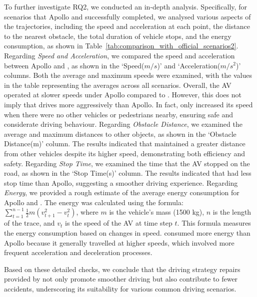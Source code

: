 To further investigate RQ2, we conducted an in-depth analysis. Specifically, for scenarios that Apollo and \coolname successfully completed, we analysed various aspects of the trajectories, including the speed and acceleration at each point, the distance to the nearest obstacle, the total duration of vehicle stops, and the energy consumption, as shown in Table~\ref{tab:comparison_with_official_scenarios2}.
Regarding \emph{Speed and Acceleration}, we compared the speed and acceleration between Apollo and \coolname, as shown in the `Speed($m/s$)' and `Acceleration($m/s^2$)' columns. Both the average and maximum speeds were examined, with the values in the table representing the averages across all scenarios. Overall, the AV operated at slower speeds under Apollo compared to \coolname. However, this does not imply that \coolname drives more aggressively than Apollo. In fact, \coolname only increased its speed when there were no other vehicles or pedestrians nearby, ensuring safe and considerate driving behaviour.
Regarding \emph{Obstacle Distance}, we examined the average and maximum distances to other objects, as shown in the `Obstacle Distance(m)' column. The results indicated that \coolname maintained a greater distance from other vehicles despite its higher speed, demonstrating both efficiency and safety.
Regarding \emph{Stop Time}, we examined the time that the AV stopped on the road, as shown in the `Stop Time(s)' column. The results indicated that \coolname had less stop time than Apollo, suggesting a smoother driving experience.
Regarding \emph{Energy}, we provided a rough estimate of the average energy consumption for Apollo and \coolname. The energy was calculated using the formula: $\sum_{t=1}^{n-1} \frac{1}{2}m (v_{t+1}^2 - v_t^2)$, where $m$ is the vehicle's mass (1500 kg), $n$ is the length of the trace, and $v_t$ is the speed of the AV at time step $t$. This formula measures the energy consumption based on changes in speed. \coolname consumed more energy than Apollo because it generally travelled at higher speeds, which involved more frequent acceleration and deceleration processes.


Based on these detailed checks, we conclude that the driving strategy repairs provided by \coolname not only promote smoother driving but also contribute to fewer accidents, underscoring its suitability for various common driving scenarios.




